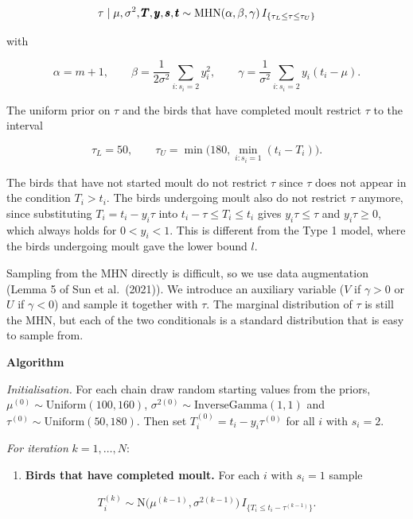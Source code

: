 \documentclass[
  12pt,
]{article}
\providecommand{\tightlist}{%
  \setlength{\itemsep}{0pt}\setlength{\parskip}{0pt}}
\renewcommand{\boldsymbol}[1]{\text{\pmb{$#1$}}}
\begin{document}
\[
\tau \mid \mu, \sigma^2, \boldsymbol{T}, \boldsymbol{y}, \boldsymbol{s}, \boldsymbol{t} \sim \text{MHN}(\alpha, \beta, \gamma) \, I_{\{\tau_L \leq \tau \leq \tau_U\}}
\]

with

\[
\alpha = m + 1, \qquad \beta = \frac{1}{2\sigma^2} \sum_{i: s_i = 2} y_i^2, \qquad \gamma = \frac{1}{\sigma^2} \sum_{i: s_i = 2} y_i (t_i - \mu).
\]

The uniform prior on \(\tau\) and the birds that have completed moult
restrict \(\tau\) to the interval

\[
\tau_L = 50, \qquad \tau_U = \min\Big(180, \min_{i: s_i = 1} (t_i - T_i)\Big).
\]

The birds that have not started moult do not restrict \(\tau\) since
\(\tau\) does not appear in the condition \(T_i > t_i\). The birds
undergoing moult also do not restrict \(\tau\) anymore, since
substituting \(T_i = t_i - y_i\tau\) into
\(t_i - \tau \leq T_i \leq t_i\) gives \(y_i \tau \leq \tau\) and
\(y_i \tau \geq 0\), which always holds for \(0 < y_i < 1\). This is
different from the Type 1 model, where the birds undergoing moult gave
the lower bound \(l\).

Sampling from the MHN directly is difficult, so we use data augmentation
(Lemma 5 of Sun et al.~(2021)). We introduce an auxiliary variable
(\(V\) if \(\gamma > 0\) or \(U\) if \(\gamma < 0\)) and sample it
together with \(\tau\). The marginal distribution of \(\tau\) is still
the MHN, but each of the two conditionals is a standard distribution
that is easy to sample from.

\textbf{Algorithm}

\emph{Initialisation.} For each chain draw random starting values from
the priors, \(\mu^{(0)} \sim \text{Uniform}(100, 160)\),
\(\sigma^{2(0)} \sim \text{InverseGamma}(1,1)\) and
\(\tau^{(0)} \sim \text{Uniform}(50, 180)\). Then set
\(T_i^{(0)} = t_i - y_i \tau^{(0)}\) for all \(i\) with \(s_i = 2\).

\emph{For iteration} \(k = 1, \dots, N\):

\begin{enumerate}
\def\labelenumi{\arabic{enumi}.}
\tightlist
\item
  \textbf{Birds that have completed moult.} For each \(i\) with
  \(s_i = 1\) sample
\end{enumerate}

\[
T_i^{(k)} \sim \text{N}\big(\mu^{(k-1)}, \sigma^{2(k-1)}\big) \, I_{\{T_i \leq t_i - \tau^{(k-1)}\}}.
\]
\end{document}
